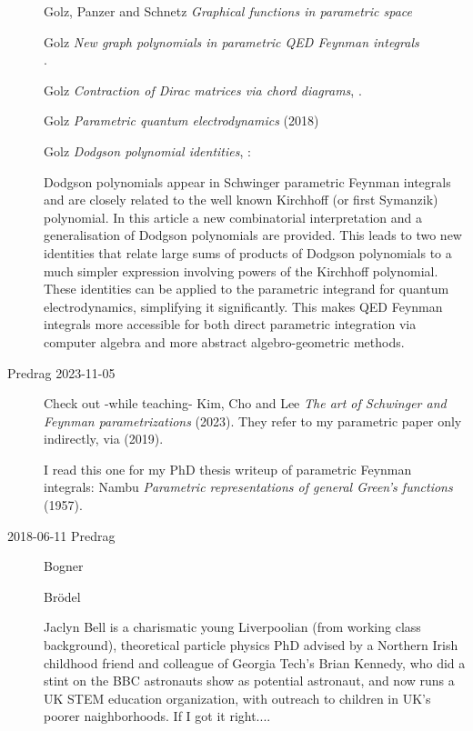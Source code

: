 \begin{description}
Golz, Panzer and Schnetz
{\em Graphical functions in parametric space}\\

Golz {\em New graph polynomials in parametric {QED} Feynman
integrals} \\
.

Golz {\em Contraction of {Dirac} matrices via chord diagrams},
.

Golz {\em Parametric quantum electrodynamics} (2018)

Golz {\em Dodgson polynomial identities}, :

Dodgson polynomials appear in Schwinger parametric Feynman integrals and
are closely related to the well known Kirchhoff (or first Symanzik)
polynomial. In this article a new combinatorial interpretation and a
generalisation of Dodgson polynomials are provided. This leads to two new
identities that relate large sums of products of Dodgson polynomials to a
much simpler expression involving powers of the Kirchhoff polynomial.
These identities can be applied to the parametric integrand for quantum
electrodynamics, simplifying it significantly. This makes QED Feynman
integrals more accessible for both direct parametric integration via
computer algebra and more abstract algebro-geometric methods.

\item[Predrag 2023-11-05]
Check out -while teaching-
Kim, Cho and Lee
{\em The art of Schwinger and Feynman parametrizations}
(2023).
They refer to my parametric paper only indirectly, via
 (2019).

I read this one for my PhD thesis writeup of parametric
Feynman integrals:
Nambu
{\em Parametric representations of general {Green's} functions}
(1957).

\item[2018-06-11 Predrag]
Bogner

Br\"odel

Jaclyn Bell is a charismatic young Liverpoolian (from working class
background), theoretical particle physics PhD advised by a Northern Irish
childhood friend and colleague of Georgia Tech's Brian Kennedy, who did a
stint on the BBC astronauts show as potential astronaut, and now runs a
UK STEM education organization, with outreach to children in
UK's poorer naighborhoods. If I got it right....


\end{description}
